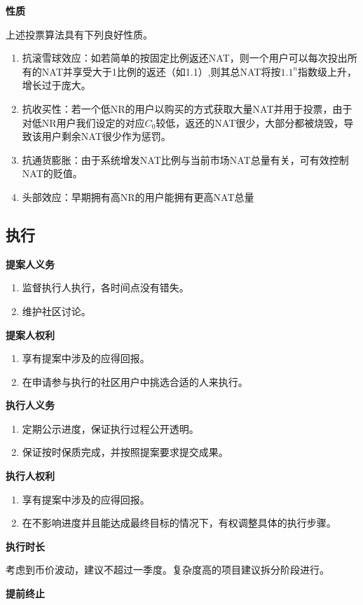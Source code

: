 \textbf{性质}

上述投票算法具有下列良好性质。
\begin{enumerate}
	\item 抗滚雪球效应：如若简单的按固定比例返还NAT，则一个用户可以每次投出所有的NAT并享受大于1比例的返还（如1.1）,则其总NAT将按$1.1^n$指数级上升，增长过于庞大。
	\item 抗收买性：若一个低NR的用户以购买的方式获取大量NAT并用于投票，由于对低NR用户我们设定的对应$C_0$较低，返还的NAT很少，大部分都被烧毁，导致该用户剩余NAT很少作为惩罚。
	\item 抗通货膨胀：由于系统增发NAT比例与当前市场NAT总量有关，可有效控制NAT的贬值。
	\item 头部效应：早期拥有高NR的用户能拥有更高NAT总量
\end{enumerate}

\subsection{执行}
\textbf{提案人义务}
\begin{enumerate}
\item 监督执行人执行，各时间点没有错失。
\item 维护社区讨论。
\end{enumerate}

\textbf{提案人权利}
\begin{enumerate}
\item 享有提案中涉及的应得回报。
\item 在申请参与执行的社区用户中挑选合适的人来执行。
\end{enumerate}

\textbf{执行人义务}
\begin{enumerate}
\item 定期公示进度，保证执行过程公开透明。
\item 保证按时保质完成，并按照提案要求提交成果。
\end{enumerate}

\textbf{执行人权利}
\begin{enumerate}
\item 享有提案中涉及的应得回报。
\item 在不影响进度并且能达成最终目标的情况下，有权调整具体的执行步骤。
\end{enumerate}

\textbf{执行时长}

考虑到币价波动，建议不超过一季度。复杂度高的项目建议拆分阶段进行。

\textbf{提前终止}

